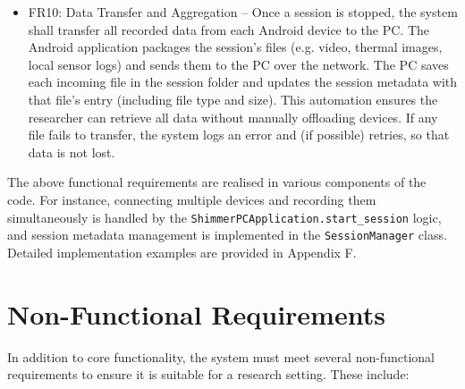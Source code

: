 \begin{itemize}
  \item FR10: Data Transfer and Aggregation -- Once a session is stopped, the system shall transfer all recorded data from each Android device to the PC. The Android application packages the session's files (e.g. video, thermal images, local sensor logs) and sends them to the PC over the network. The PC saves each incoming file in the session folder and updates the session metadata with that file's entry (including file type and size). This automation ensures the researcher can retrieve all data without manually offloading devices. If any file fails to transfer, the system logs an error and (if possible) retries, so that data is not lost.
\end{itemize}

The above functional requirements are realised in various components of the code. For instance, connecting multiple devices and recording them simultaneously is handled by the \texttt{ShimmerPCApplication.start\_session} logic, and session metadata management is implemented in the \texttt{SessionManager} class. Detailed implementation examples are provided in Appendix F.

\section{Non-Functional Requirements}
In addition to core functionality, the system must meet several non-functional requirements to ensure it is suitable for a research setting. These include:

